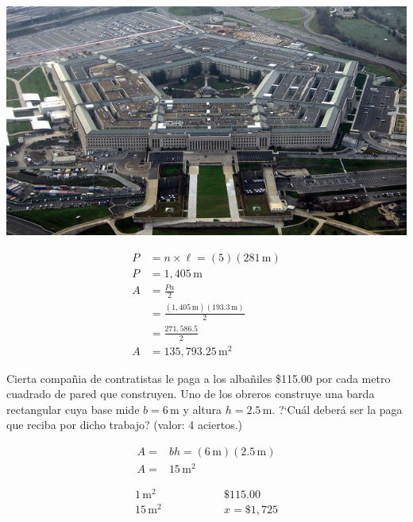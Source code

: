 \documentclass[11pt]{article}
\begin{document}
\begin{multicols}{2}
\noindent
\begin{minipage}[t]{0.5\linewidth}
\includegraphics[width=1.3\linewidth]{pentagono.jpg}
\label{fig:pentagono}
\end{minipage}

\begin{minipage}[t]{0.6\linewidth}
\vspace{-9mm} 
\begin{align*}
\textit{P} &= n \times \ell = (5) (281\,\text{m}) \\
P &= 1,405 \,\text{m} \\
A &= \frac{Pa}{2}  \\ 
  &= \frac{(1,405\,\text{m})(193.3\,\text{m})}{2} \\
  &= \frac{271,586.5}{2} \\
A &= 135,793.25\,\text{m}^{2}
\end{align*}
\end{minipage}

\end{multicols}


Cierta compa\~nia de contratistas le paga a los alba\~niles \$115.00 por cada
metro cuadrado de pared que construyen. Uno de los obreros construye una barda
rectangular cuya base mide $b=6$\,m y altura $h=2.5$\,m. ?`Cu\'al deber\'a ser
la paga que reciba por dicho trabajo? \hfill(valor: 4 aciertos.)


\begin{minipage}[c]{0.5\linewidth}    

\begin{align*}
A =& bh = (6\,\text{m})(2.5\,\text{m}) \\
A =&  15\,\text{m}^2 
\end{align*}

\end{minipage}
\begin{minipage}[c]{0.5\linewidth}
    
\begin{align*}
1\,\text{m}^{2}& \qquad \qquad & \$115.00 \\
15\,\text{m}^{2}& \qquad \qquad & x = \$1,725
\end{align*}

\end{minipage}
\end{document}
